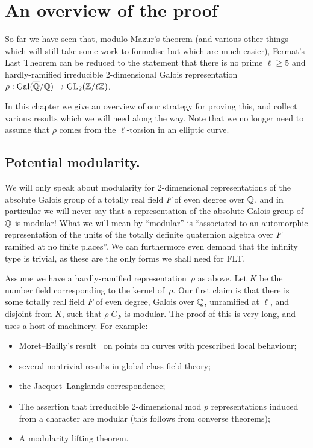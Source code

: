 \chapter{An overview of the proof}\label{ch_overview}

So far we have seen that, modulo Mazur's theorem (and various other things which will still take some work to formalise but which are much easier), Fermat's Last Theorem can be reduced
to the statement that there is no prime $\ell\geq 5$ and hardly-ramified
irreducible 2-dimensional Galois representation $\rho:\operatorname{Gal}(\overline{\mathbb{Q}}/\mathbb{Q})\to\operatorname{GL}_2(\mathbb{Z}/\ell\mathbb{Z})$.

In this chapter we give an overview of our strategy for proving this, and collect
various results which we will need along the way. Note that we no longer need to assume that $\rho$ comes from the $\ell$-torsion in an elliptic curve.

\section{Potential modularity.}

We will only speak about modularity for 2-dimensional representations of the
absolute Galois group of a totally real field $F$ of even degree over $\mathbb{Q}$, and in particular we will
never say that a representation of the absolute Galois group of $\mathbb{Q}$ is modular! What we will
mean by ``modular'' is ``associated to an automorphic representation of the
units of the totally definite quaternion algebra over $F$ ramified at no finite places''.
We can furthermore even demand that the infinity type is trivial, as these are the only
forms we shall need for FLT.

Assume we have a hardly-ramified representation~$\rho$ as above. Let $K$
be the number field corresponding to the kernel of~$\rho$. Our first claim
is that there is some totally real field $F$ of even degree, Galois over $\mathbb{Q}$,
unramified at $\ell$, and disjoint from $K$, such that $\rho|G_F$ is modular.
The proof of this is very long, and uses a host of machinery. For example:
\begin{itemize}
    \item Moret--Bailly's result~\cite{moret-bailly} on points on curves with prescribed
    local behaviour;
    \item several nontrivial results in global class field theory;
    \item the Jacquet--Langlands correspondence;
    \item The assertion that irreducible 2-dimensional mod $p$ representations induced from a character are modular (this follows from converse theorems);
    \item A modularity lifting theorem.
\end{itemize}

